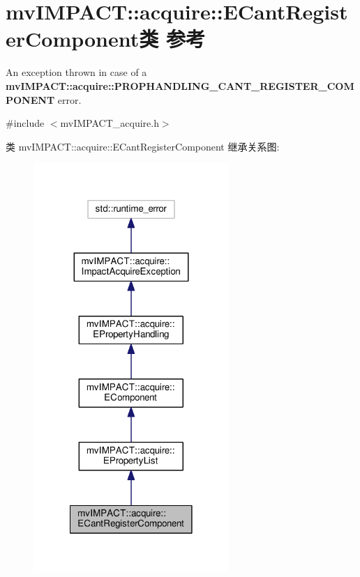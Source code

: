 \hypertarget{classmv_i_m_p_a_c_t_1_1acquire_1_1_e_cant_register_component}{\section{mv\+I\+M\+P\+A\+C\+T\+:\+:acquire\+:\+:E\+Cant\+Register\+Component类 参考}
\label{classmv_i_m_p_a_c_t_1_1acquire_1_1_e_cant_register_component}
}


An exception thrown in case of a {\bfseries mv\+I\+M\+P\+A\+C\+T\+::acquire\+::\+P\+R\+O\+P\+H\+A\+N\+D\+L\+I\+N\+G\+\_\+\+C\+A\+N\+T\+\_\+\+R\+E\+G\+I\+S\+T\+E\+R\+\_\+\+C\+O\+M\+P\+O\+N\+E\+N\+T} error.  




{\ttfamily \#include $<$mv\+I\+M\+P\+A\+C\+T\+\_\+acquire.\+h$>$}



类 mv\+I\+M\+P\+A\+C\+T\+:\+:acquire\+:\+:E\+Cant\+Register\+Component 继承关系图\+:
\nopagebreak
\begin{figure}[H]
\begin{center}
\leavevmode
\includegraphics[width=210pt]{classmv_i_m_p_a_c_t_1_1acquire_1_1_e_cant_register_component__inherit__graph}
\end{center}
\end{figure}


